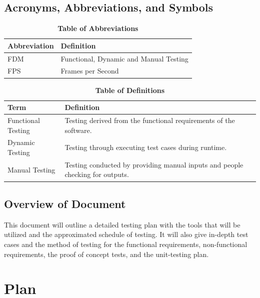 \documentclass[12pt, titlepage]{article}
\begin{document}
\subsection{Acronyms, Abbreviations, and Symbols}
	
\begin{table}[hbp]
\caption{\textbf{Table of Abbreviations}} \label{Abbrev}

\begin{tabularx}{\textwidth}{p{3.5cm}X}
\toprule
\textbf{Abbreviation} & \textbf{Definition} \\
\midrule
FDM & Functional, Dynamic and Manual Testing\\
FPS & Frames per Second\\
\bottomrule
\end{tabularx}

\end{table}

\begin{table}[!htbp]
\caption{\textbf{Table of Definitions}} \label{Defs}

\begin{tabularx}{\textwidth}{p{3.5cm}X}
\toprule
\textbf{Term} & \textbf{Definition}\\
\midrule
Functional Testing & Testing derived from the functional requirements of the software.\\
Dynamic Testing & Testing through executing test cases during runtime.\\
Manual Testing & Testing conducted by providing manual inputs and people checking for outputs.\\
\bottomrule
\end{tabularx}

\end{table}	

\subsection{Overview of Document}

This document will outline a detailed testing plan with the tools that will be utilized and the approximated schedule of testing. It will also give in-depth test cases and the method of testing for the functional requirements, non-functional requirements, the proof of concept tests, and the unit-testing plan.

\section{Plan}
	
\end{document}
